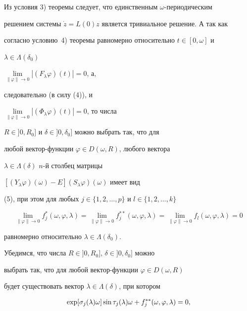  


\begin{pf} 


Из условия 3) теоремы следует, что единственным $\omega$-периодическим 


решением системы $\Dot z=L(0)z$ является тривиальное решение. А так как 


согласно условию~4) теоремы равномерно относительно $t\in[0,\omega]$ и 


$\lambda\in\Lambda(\delta_0)$\; 


$\lim\limits_{\|\varphi\|\to0}|(F_\lambda\varphi)(t)|=0$, а, 


следовательно (в силу (4)), и 


$\lim\limits_{\|\varphi\|\to0}|(\Phi_\lambda\varphi)(t)|=0$, то числа 


$R\in]0,R_0]$ и $\delta\in]0,\delta_0]$ можно выбрать так, что для 


любой вектор-функции $\varphi\in D(\omega,R)$, любого вектора 


$\lambda\in\Lambda(\delta)$\; $n$-й столбец матрицы 


$[(Y_\lambda\varphi)(\omega)-E](S_\lambda\varphi)(\omega)$ имеет вид 


(5), при этом для любых $j\in\{1,2,\dotsc,p\}$ и $l\in\{1,2,\dotsc,k\}$ 


\begin{equation} 


\lim_{\|\varphi\|\to0}f^*_j(\omega,\varphi,\lambda)= 


\lim_{\|\varphi\|\to0}f^{**}_j(\omega,\varphi,\lambda)= 


\lim_{\|\varphi\|\to0}f_l(\omega,\varphi,\lambda)=0 


\end{equation} 


равномерно относительно $\lambda\in\Lambda(\delta_0)$. 


 


Убедимся, что числа $R\in]0,R_0]$, $\delta\in]0,\delta_0]$ можно 


выбрать так, что для любой вектор-функции $\varphi\in D(\omega,R)$ 


будет существовать вектор $\lambda\in\Lambda(\delta)$, при котором 


\begin{gather} 


\exp[\sigma_j(\lambda)\omega]\sin\tau_j(\lambda)\omega+ 


f^{**}_j(\omega,\varphi,\lambda)=0,\notag\\ 



\end{gather}
\end{pf}
